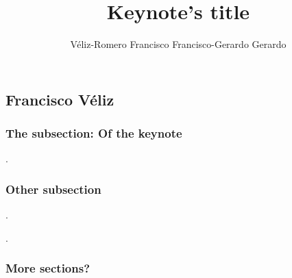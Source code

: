 \conference

\newpage
\begin{refsection}
\begin{wrap}
	\chapter{Francisco Véliz}
\end{wrap}
\cero
{}
\author{%
	Véliz-Romero Francisco Francisco-Gerardo Gerardo
}
\title{Keynote's title}

\maketitle

\vspace{.5cm}
\begin{resumen}
	\blindtext
	\blindtext
	\blindtext
\end{resumen}


\subsection*{The subsection: Of the keynote}

\blindtext[1] \textcite{example}. \blindtext[1]

\blindtext[1] \parencite{example-5}

\subsection*{Other subsection}

\blindtext[1] \parencite{example-2}.

\blindtext[1] \textcite{example-1,example-2} \blindtext[1] \parencite{example-6}.

\subsection*{More sections?}


\end{refsection}
